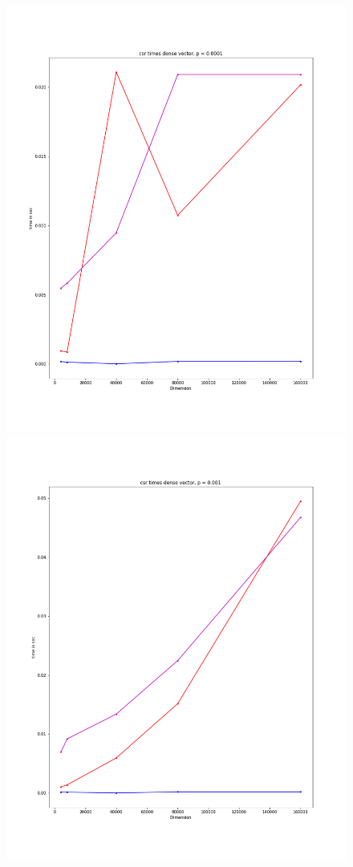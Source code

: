 \documentclass[12pt]{article}
\begin{document}
\begin{figure}[h]
  \includegraphics[scale = 0.16]{csr_dv_0001.png}
  \includegraphics[scale = 0.16]{csr_dv_001.png}

\end{figure}
\end{document}
